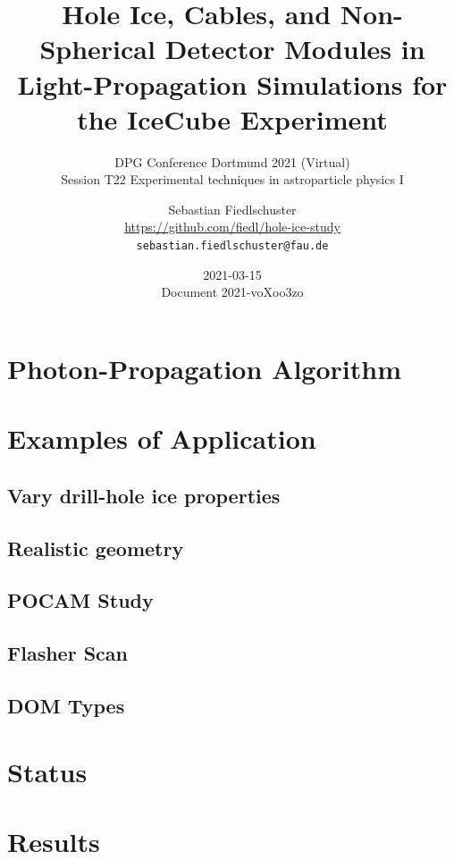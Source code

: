 \documentclass[green, 12pt]{beamer}
\title[Hole Ice, Cables, and Non-Spherical Detector Modules in Light-Propagation Simulations]{Hole Ice, Cables, and Non-Spherical Detector Modules in Light-Propagation Simulations for the IceCube Experiment}
\subtitle{DPG Conference Dortmund 2021 (Virtual)\\ Session T22 Experimental techniques in astroparticle physics I}
\date{2021-03-15 \\ \vspace*{2mm}\tiny{Document 2021-voXoo3zo} \normalsize}
\author[Sebastian Fiedlschuster, ECAP Erlangen, 2021-03-15]{Sebastian Fiedlschuster \\ \tiny{\url{https://github.com/fiedl/hole-ice-study}} \\ \tiny\texttt{sebastian.fiedlschuster@fau.de}}
\institute{Erlangen Centre for Astroparticle Physics}
\newif\ifplacelogo %
\begin{document}



\placelogofalse

  
  
  
%  

\section{Photon-Propagation Algorithm}
  

\section{Examples of Application}
\subsection{Vary drill-hole ice properties}
  
\subsection{Realistic geometry}
  
\subsection{POCAM Study}
  
\subsection{Flasher Scan}
%  
  
\subsection{DOM Types}
  

\section{Status}
  
\section{Results}
  
\end{document}
